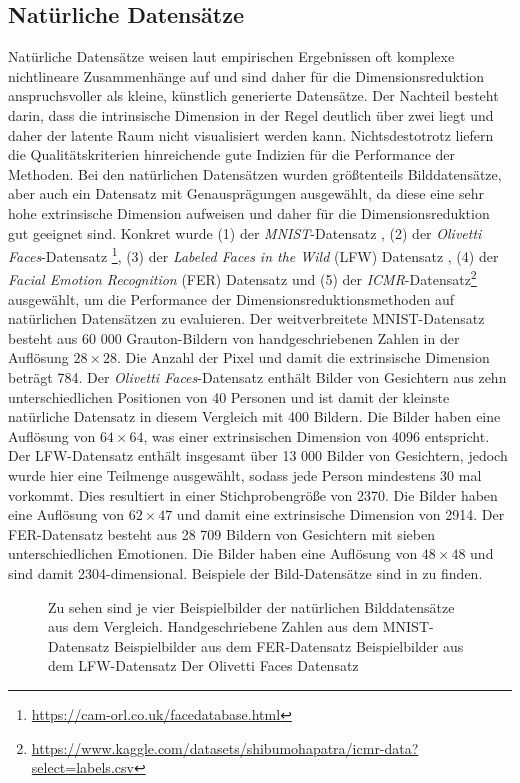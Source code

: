 \subsection{Natürliche Datensätze}
\label{ch:Vergleich:sec:VerwendeteDatensaetze:natuerlich}
Natürliche
Datensätze weisen laut empirischen Ergebnissen \addref oft komplexe nichtlineare Zusammenhänge
auf und sind daher für die Dimensionsreduktion anspruchsvoller als kleine, künstlich generierte
Datensätze. Der Nachteil besteht darin, dass die intrinsische Dimension in der Regel deutlich über
zwei liegt und daher der latente Raum nicht visualisiert werden kann. Nichtsdestotrotz liefern die
Qualitätskriterien hinreichende gute Indizien für die Performance der Methoden. Bei den natürlichen
Datensätzen wurden größtenteils Bilddatensätze, aber auch ein Datensatz mit Genausprägungen ausgewählt, da diese eine
sehr hohe extrinsische Dimension aufweisen und daher für die Dimensionsreduktion gut geeignet sind.
Konkret wurde (1) der \textit{MNIST}-Datensatz \parencite{LeCun.2010}, (2) der \textit{Olivetti Faces}-Datensatz
\footnote{\url{https://cam-orl.co.uk/facedatabase.html}}, (3) der \textit{Labeled Faces in the
	Wild} (LFW) Datensatz \parencite{GaryB.Huang.2007}, (4) der \textit{Facial Emotion Recognition} (FER) Datensatz \parencite{DumitruIanGoodfellowWillCukierskiYoshuaBengio.2013} und (5) der
\textit{ICMR}-Datensatz\footnote{\url{https://www.kaggle.com/datasets/shibumohapatra/icmr-data?select=labels.csv}}
ausgewählt, um die Performance der Dimensionsreduktionsmethoden auf natürlichen Datensätzen zu
evaluieren. Der weitverbreitete MNIST-Datensatz besteht aus 60 000 Grauton-Bildern von
handgeschriebenen Zahlen in der Auflösung $28 \times 28$. Die Anzahl der Pixel und damit die
extrinsische Dimension beträgt 784. Der \textit{Olivetti Faces}-Datensatz enthält Bilder von
Gesichtern aus zehn unterschiedlichen Positionen von 40 Personen und ist damit der kleinste
natürliche Datensatz in diesem Vergleich mit 400 Bildern. Die Bilder haben eine Auflösung von $64
	\times 64$, was einer extrinsischen Dimension von 4096 entspricht. Der LFW-Datensatz enthält
insgesamt über 13 000 Bilder von Gesichtern, jedoch wurde hier eine Teilmenge ausgewählt, sodass
jede Person mindestens 30 mal vorkommt. Dies resultiert in einer Stichprobengröße von 2370. Die
Bilder haben eine Auflösung von $62 \times 47$ und damit eine extrinsische Dimension von 2914. Der
FER-Datensatz besteht aus 28 709 Bildern von Gesichtern mit sieben unterschiedlichen Emotionen. Die
Bilder haben eine Auflösung von $48 \times 48$ und sind damit 2304-dimensional. Beispiele der
Bild-Datensätze sind in  zu finden.
\begin{figure}
	\begin{center}
		
	\end{center}
	\caption[Beispielbilder der natürlichen Datensätze]{Zu sehen sind je vier Beispielbilder der natürlichen Bilddatensätze aus dem Vergleich. \captiona Handgeschriebene Zahlen aus dem MNIST-Datensatz \captionb Beispielbilder aus dem FER-Datensatz \captionc Beispielbilder aus dem LFW-Datensatz \captiond Der Olivetti Faces Datensatz }
	\label{fig:Dataset_samples}
\end{figure}

